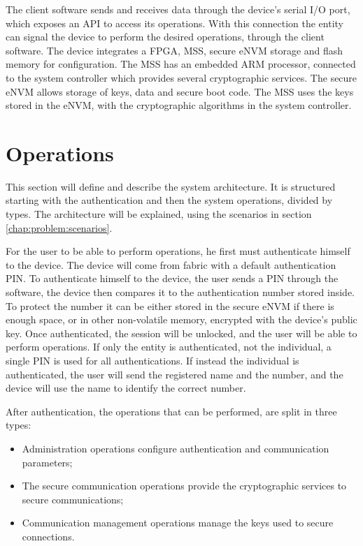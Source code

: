 The client software sends and receives data through the device's serial I/O port, which exposes an \ac{API} to access its operations.
With this connection the entity can signal the device to perform the desired operations, through the client software.
The device integrates a \ac{FPGA}, \ac{MSS}, secure eNVM storage and flash memory for configuration. The \ac{MSS} has an embedded ARM processor, connected to the system controller which provides several cryptographic services. The secure eNVM allows storage of keys, data and secure boot code.
The \ac{MSS} uses the keys stored in the eNVM, with the cryptographic algorithms in the system controller.

\section{Operations}\label{chap:arch:ops}

This section will define and describe the system architecture. It is structured starting with the authentication and then the system operations, divided by types.
The architecture will be explained, using the scenarios in section \ref{chap:problem:scenarios}.

For the user to be able to perform operations, he first must authenticate himself to the device. The device will come from fabric with a default authentication \ac{PIN}. To authenticate himself to the device, the user sends a \ac{PIN} through the software, the device then compares it to the authentication number stored inside. To protect the number it can be either stored in the secure eNVM if there is enough space, or in other non-volatile memory, encrypted with the device's public key. Once authenticated, the session will be unlocked, and the user will be able to perform operations.
If only the entity is authenticated, not the individual, a single \ac{PIN} is used for all authentications.
If instead the individual is authenticated, the user will send the registered name and the number, and the device will use the name to identify the correct number.

After authentication, the operations that can be performed, are split in three types:
\begin{itemize}
    \item Administration operations configure authentication and communication parameters;
    \item The secure communication operations provide the cryptographic services to secure communications;
    \item Communication management operations manage the keys used to secure connections.
\end{itemize}

